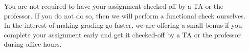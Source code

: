 You are not required to have your assignment checked-off by a TA or the professor.
If you do not do so, then we will perform a functional check ourselves.
In the interest of making grading go faster, we are offering a small bonus %
if you complete your assignment early and get it checked-off by a TA or the professor during office hours.

\begin{enumerate}
    \vspace{1cm}



\end{enumerate}
